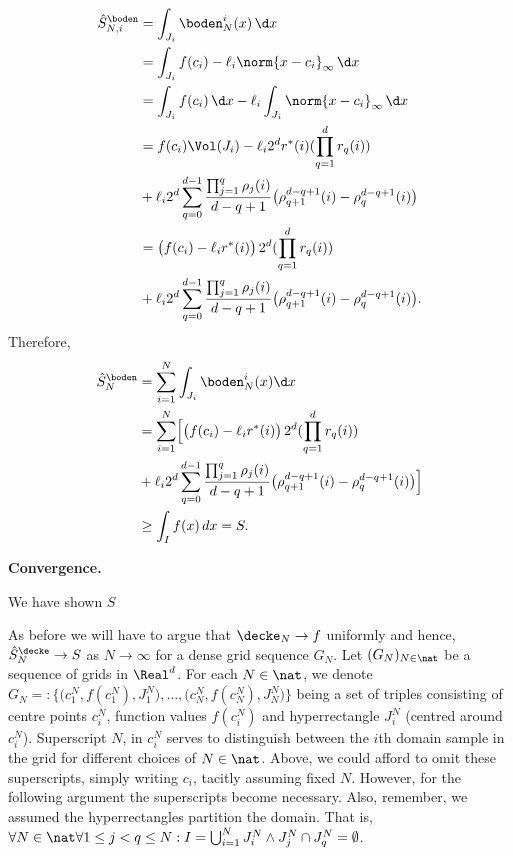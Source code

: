 \begin{align*} 
%
\hat S_{N,i}^\boden &=\int_{J_i} \boden^i_N( x) \, \d x \\
%
& = \int_{J_i} f(c_i) - \ell_i \norm{x-c_i}_{\infty} \, \d x \\
%
& = \int_{J_i} f(c_i) \, \d x - \ell_i \int_{J_i}  \norm{x-c_i}_{\infty} \, \d x \\
%
& = f(c_i) \Vol(J_i) - \ell_i 2^d r^{*}(i) (\prod_{q=1}^d r_q(i)) \\
&+ \ell_i 2^d \sum_{q=0}^{d-1} \frac{\prod_{j=1}^{q} \rho_j(i) }{d-q+1} \bigl(\rho_{q+1}^{d-q+1}(i) - \rho_{q}^{d-q+1}(i) \bigr) \\
%
& = \bigl(f(c_i) -  \ell_i r^{*}(i) \bigr) \,2^d (\prod_{q=1}^d r_q(i)) \\
&+ \ell_i 2^d \sum_{q=0}^{d-1} \frac{\prod_{j=1}^{q} \rho_j(i) }{d-q+1} \bigl(\rho_{q+1}^{d-q+1}(i) - \rho_{q}^{d-q+1}(i) \bigr). 
\end{align*}
%
Therefore,
\begin{align} \label{eq:quadlower_multidim}
\hat S_N^\boden &= \sum_{i=1}^N \int_{J_i} \boden^i_N( x) \d x \\
&= \sum_{i=1}^N  \Bigl[ \bigl(f(c_i) -  \ell_i r^{*}(i) \bigr) \,2^d (\prod_{q=1}^d r_q(i)) \\
&+ \ell_i 2^d \sum_{q=0}^{d-1} \frac{\prod_{j=1}^{q} \rho_j(i) }{d-q+1} \bigl(\rho_{q+1}^{d-q+1}(i) - \rho_{q}^{d-q+1}(i) \bigr) \Bigr]\\
& \geq \int_I f(x) \,dx = S.
\end{align}

\textbf{Convergence.}


We have shown $S$

As before we will have to argue that $\decke_N \to f$ uniformly and hence, $\hat S_N^\decke \to S$ as $N \to \infty$ 
for a dense grid sequence $G_N$.
Let $(G_N)_{N \in \nat}$ be a sequence of grids in $\Real^d$. For each  $N \in \nat$, we denote $G_N =: \{\bigl(c_1^N,f(c_1^N), J_1^N\bigr),\ldots,\bigl(c_N^N,f(c_N^N), J_N^N\bigr)\}$ being a set of triples consisting of centre points $c_i^N$, function values $f(c_i^N)$ and hyperrectangle $J_i^N$ (centred around $c_i^N$). 
Superscript $N$, in $c_i^N$ serves to distinguish between the $i$th domain sample in the grid for different choices of $N \in \nat$. Above, we could afford to omit these superscripts, simply writing $c_i$, tacitly assuming fixed $N$. However, for the following argument the superscripts become necessary.
Also, remember, we assumed the hyperrectangles partition the domain. That is, $\forall N \in \nat \forall 1\leq j< q \leq N:  I = \bigcup_{i=1}^N J_i^N \wedge J_j^N \cap J_q^N = \emptyset$.



